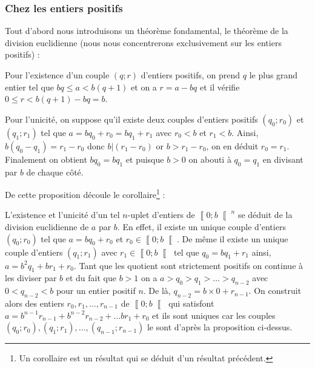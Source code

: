 \documentclass[a4paper,french,12pt]{article}
\begin{document}
\subsubsection{Chez les entiers positifs}
Tout d'abord nous introduisons un théorème fondamental, le théorème de la division euclidienne (nous nous concentrerons exclusivement sur les entiers positifs) :

\hypertarget{15}{}

\newPreuve Pour l'existence d'un couple $\left(q;r\right)$ d'entiers positifs, on prend $q$ le plus grand entier tel que $bq\leqslant a<b\left(q+1\right)$ et on a $r=a-bq$ et il vérifie $0\leqslant r<b\left(q+1\right)-bq=b$.

Pour l'unicité, on suppose qu'il existe deux couples d'entiers positifs $\left(q_0;r_0\right)$ et $\left(q_1;r_1\right)$ tel que $a=bq_0+r_0=bq_1+r_1$ avec $r_0<b$ et $r_1<b$. Ainsi, $b\left(q_0-q_1\right)=r_1-r_0$ donc $b|\left(r_1-r_0\right)$ or $b>r_1-r_0$, on en déduit $r_0=r_1$. Finalement on obtient $bq_0=bq_1$ et puisque $b>0$ on abouti à $q_0=q_1$ en divisant par $b$ de chaque côté.

De cette proposition découle le corollaire\footnote{Un corollaire est un résultat qui se déduit d'un résultat précédent.} :


\newPreuve L'existence et l'unicité d'un tel $n$-uplet d'entiers de $\left\llbracket0;b\right\llbracket^n$ se déduit de la division euclidienne de $a$ par $b$. En effet, il existe un unique couple d'entiers $\left(q_0;r_0\right)$ tel que $a=bq_0+r_0$ et $r_0\in\left\llbracket0;b\right\llbracket$. De même il existe un unique couple d'entiers $\left(q_1;r_1\right)$ avec $r_1\in\left\llbracket0;b\right\llbracket$ tel que $q_0=bq_1+r_1$ ainsi, $a=b^2q_1+br_1+r_0$. Tant que les quotient sont strictement positifs on continue à les diviser par $b$ et du fait que $b>1$ on a $a>q_0>q_1>\ldots>q_{n-2}$ avec $0<q_{n-2}<b$ pour un entier positif $n$. De là, $q_{n-2}=b\times0+r_{n-1}$. On construit alors des entiers $r_0,r_1,\ldots,r_{n-1}$ de $\left\llbracket0;b\right\llbracket$ qui satisfont $a=b^{n-1}r_{n-1}+b^{n-2}r_{n-2}+\ldots br_1+r_0$ et ils sont uniques car les couples $\left(q_0;r_0\right),\left(q_1;r_1\right),\ldots,\left(q_{n-1};r_{n-1}\right)$ le sont d'après la proposition ci-dessus.
\end{document}
